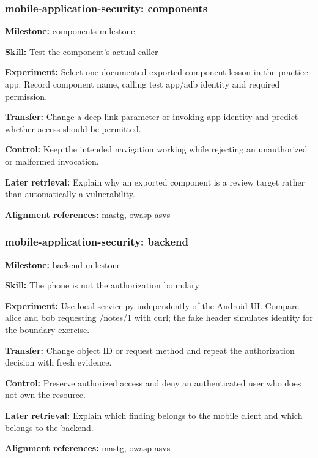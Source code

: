 \subsubsection{mobile-application-security: components}
\noindent\textbf{Milestone:} components-milestone\par
\noindent\textbf{Skill:} Test the component's actual caller\par
\noindent\textbf{Experiment:} Select one documented exported-component lesson in the practice app. Record component name, calling test app/adb identity and required permission.\par
\noindent\textbf{Transfer:} Change a deep-link parameter or invoking app identity and predict whether access should be permitted.\par
\noindent\textbf{Control:} Keep the intended navigation working while rejecting an unauthorized or malformed invocation.\par
\noindent\textbf{Later retrieval:} Explain why an exported component is a review target rather than automatically a vulnerability.\par
\noindent\textbf{Alignment references:} mastg, owasp-asvs\par
\subsubsection{mobile-application-security: backend}
\noindent\textbf{Milestone:} backend-milestone\par
\noindent\textbf{Skill:} The phone is not the authorization boundary\par
\noindent\textbf{Experiment:} Use local service.py independently of the Android UI. Compare alice and bob requesting /notes/1 with curl; the fake header simulates identity for the boundary exercise.\par
\noindent\textbf{Transfer:} Change object ID or request method and repeat the authorization decision with fresh evidence.\par
\noindent\textbf{Control:} Preserve authorized access and deny an authenticated user who does not own the resource.\par
\noindent\textbf{Later retrieval:} Explain which finding belongs to the mobile client and which belongs to the backend.\par
\noindent\textbf{Alignment references:} mastg, owasp-asvs\par
